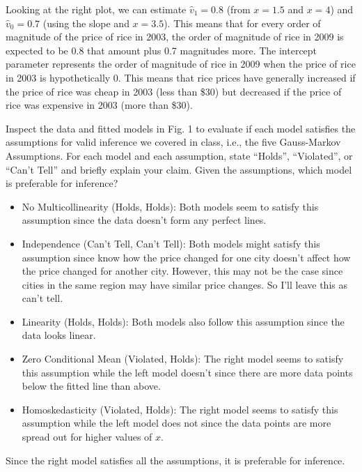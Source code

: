 \documentclass{article}
\begin{document}
\begin{probset}
\begin{prob} 
\begin{subprobset}
\begin{subprob}
            \begin{soln}
                Looking at the right plot, we can estimate $\hat{v}_1 = 0.8$ (from $x = 1.5$ and $x = 4$) and $\hat{v}_0 = 0.7$ (using the slope and $x = 3.5$). This means that for every order of magnitude of the price of rice in 2003, the order of magnitude of rice in 2009 is expected to be 0.8 that amount plus 0.7 magnitudes more. The intercept parameter represents the order of magnitude of rice in 2009 when the price of rice in 2003 is hypothetically 0. This means that rice prices have generally increased if the price of rice was cheap in 2003 (less than \$30) but decreased if the price of rice was expensive in 2003 (more than \$30).
            \end{soln}
        \end{subprob}

        \begin{subprob}
            Inspect the data and fitted models in Fig. 1 to evaluate if each model satisfies the assumptions for valid inference we covered in class, i.e., the five Gauss-Markov Assumptions. For each model and each assumption, state “Holds”, “Violated”, or “Can't Tell” and briefly explain your claim. Given the assumptions, which model is preferable for inference?

            \begin{soln}
                \begin{itemize}
                    \item No Multicollinearity (Holds, Holds): Both models seem to satisfy this assumption since the data doesn't form any perfect lines.
                    \item Independence (Can't Tell, Can't Tell): Both models might satisfy this assumption since know how the price changed for one city doesn't affect how the price changed for another city. However, this may not be the case since cities in the same region may have similar price changes. So I'll leave this as can't tell.
                    \item Linearity (Holds, Holds): Both models also follow this assumption since the data looks linear.
                    \item Zero Conditional Mean (Violated, Holds): The right model seems to satisfy this assumption while the left model doesn't since there are more data points below the fitted line than above.
                    \item Homoskedasticity (Violated, Holds): The right model seems to satisfy this assumption while the left model does not since the data points are more spread out for higher values of $x$.
                \end{itemize}
                Since the right model satisfies all the assumptions, it is preferable for inference.
            \end{soln}
        \end{subprob}
    \end{subprobset}
\end{prob}


\end{probset}
\end{document}
